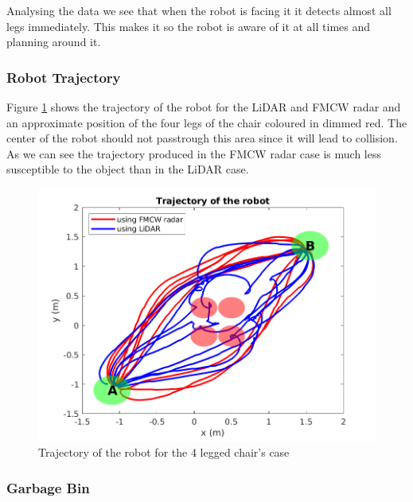 Analysing the data we see that when the robot is facing it it detects almost all legs immediately. 
This makes it so the robot is aware of it at all times and planning around it.


\subsubsection*{Robot Trajectory}

Figure \ref{fig:traj2} shows the trajectory of the robot for the \ac{LiDAR} and \ac{FMCW} \ac{radar} and an approximate position of the four legs of the chair coloured in dimmed red. The center of the robot should not passtrough this area since it will lead to collision. As we can see the trajectory  produced in the \ac{FMCW} radar case is much less susceptible to the object than in the \ac{LiDAR} case. 
\begin{figure}[ht!]
\centerline{\includegraphics [width=0.7 \textwidth]{imgs/chapter5/traj2.png}}
\caption{Trajectory of the robot for the 4 legged chair's case}
\label{fig:traj2}
\end{figure}

\subsubsection{Garbage Bin}

